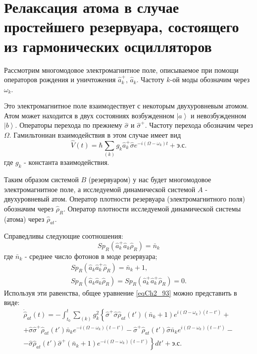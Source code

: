 \section{Релаксация атома в случае простейшего
  резервуара, состоящего из гармонических осцилляторов}
Рассмотрим многомодовое электромагнитное поле, описываемое при помощи
операторов рождения и уничтожения $\hat{a}_k^{+}$,
$\hat{a}_k$. Частоту $k$-ой моды обозначим через $\omega_k$. 

Это электромагнитное поле взаимодествует с некоторым двухуровневым
атомом. Атом может находится в двух состояниях 
возбужденном $\left|a\right>$ и невозбужденном
$\left|b\right>$. Операторы перехода по прежнему 
$\hat{\sigma}$ и $\hat{\sigma}^{+}$. Частоту перехода обозначим через
$\Omega$. Гамильтониан взаимодействия в этом случае имеет вид  
\begin{equation}
\hat{V}\left(t\right) = \hbar
\sum_{(k)} g_k \hat{a}_k^{+} \hat{\sigma}e^{-i \left(
\Omega - \omega_k
\right) t} +
\mbox{э.с.}
\label{eqCh2_94}
\end{equation}
где $g_k$ - константа взаимодействия.

Таким образом системой $B$ (резервуаром) у нас будет многомодовое
электромагнитное поле, а исследуемой динамической системой $A$ -
двухуровневый атом. Оператор плотности резервуара (электромагнитного
поля) обозначим через $\hat{\rho}_R$. Оператор плотности исследуемой
динамической системы (атома) через $\hat{\rho}_{at}$.

Справедливы следующие соотношения:
\begin{equation}
Sp_R\left(
\hat{a}_k^{+}
\hat{a}_k
\hat{\rho}_R
\right) = \bar{n}_k
\label{eqCh2_96}
\end{equation}
где $\bar{n}_k$ -
среднее число фотонов в моде резервуара; 
\begin{eqnarray}
Sp_R\left(\hat{a}_k\hat{a}_k^{+}\hat{\rho}_R\right) = \bar{n}_k + 1,
\nonumber \\
Sp_R\left(\hat{a}_k\hat{a}_k\hat{\rho}_R\right) = 
Sp_R\left(\hat{a}_k^{+}\hat{a}_k^{+}\hat{\rho}_R\right) = 0.
\label{eqCh2_96_add}
\end{eqnarray}
Используя эти равенства, общее уравнение
\eqref{eqCh2_93} можно представить в виде:  
\begin{eqnarray}
\dot{\hat{\rho}}_{at}\left(t\right) = 
- \int_{t_0}^t\sum_{(k)}g_k^2
\left\{
\hat{\sigma}^{+} \hat{\sigma}\hat{\rho}_{at}\left(t'\right)
\left(
\bar{n}_k + 1
\right)
e^{i\left(\Omega - \omega_k\right)
\left(t - t'\right)}
+
\right.
\nonumber \\
\left.
+\hat{\sigma}\hat{\sigma}^{+}
\hat{\rho}_{at}\left(t'\right)
\bar{n}_k
e^{-i\left(\Omega - \omega_k\right)
\left(t - t'\right)} -
\hat{\sigma}^{+}
\hat{\rho}_{at}\left(t'\right)
\hat{\sigma}
\bar{n}_k
e^{i\left(\Omega - \omega_k\right)
\left(t - t'\right)}
-
\right.
\nonumber \\
-
\left.
\hat{\sigma}
\hat{\rho}_{at}\left(t'\right)
\hat{\sigma}^{+}
\left(\bar{n}_k + 1\right)
e^{-i\left(\Omega - \omega_k\right)
\left(t - t'\right)}
\right\}dt'
+ \mbox{э.с.}
\label{eqCh2_97}
\end{eqnarray}

